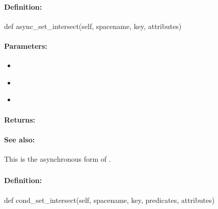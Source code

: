 \paragraph{Definition:}
\begin{pythoncode}
def async_set_intersect(self, spacename, key, attributes)
\end{pythoncode}

\paragraph{Parameters:}
\begin{itemize}[noitemsep]
\item {}\\

\item {}\\

\item {}\\

\end{itemize}

\paragraph{Returns:}


\paragraph{See also:}  This is the asynchronous form of .

\pagebreak
\subsubsection{}
\label{api:python:cond_set_intersect}


\paragraph{Definition:}
\begin{pythoncode}
def cond_set_intersect(self, spacename, key, predicates, attributes)
\end{pythoncode}


